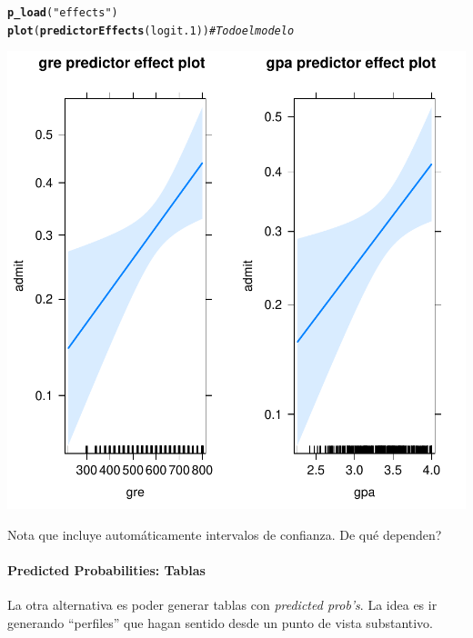 \documentclass[onesided]{article}\usepackage[]{graphicx}\usepackage[]{color}
\makeatletter
\def\maxwidth{ %
  \ifdim\Gin@nat@width>\linewidth
    \linewidth
  \else
    \Gin@nat@width
  \fi
}
\newcommand{\hlstr}[1]{\textcolor[rgb]{0.192,0.494,0.8}{#1}}%
\newcommand{\hlcom}[1]{\textcolor[rgb]{0.678,0.584,0.686}{\textit{#1}}}%
\newcommand{\hlstd}[1]{\textcolor[rgb]{0.345,0.345,0.345}{#1}}%
\newcommand{\hlkwd}[1]{\textcolor[rgb]{0.737,0.353,0.396}{\textbf{#1}}}%
\newenvironment{kframe}{%
 \def\at@end@of@kframe{}%
 \ifinner\ifhmode%
  \def\at@end@of@kframe{\end{minipage}}%
  \begin{minipage}{\columnwidth}%
 \fi\fi%
 \def\FrameCommand##1{\hskip\@totalleftmargin \hskip-\fboxsep
 \colorbox{shadecolor}{##1}\hskip-\fboxsep
     \hskip-\linewidth \hskip-\@totalleftmargin \hskip\columnwidth}%
 \MakeFramed {\advance\hsize-\width
   \@totalleftmargin\z@ \linewidth\hsize
   \@setminipage}}%
 {\par\unskip\endMakeFramed%
 \at@end@of@kframe}
\newenvironment{knitrout}{}{} %
\makeatother
\begin{document}
\begin{knitrout}
\color{fgcolor}\begin{kframe}
\begin{alltt}
\hlkwd{p_load}\hlstd{(}\hlstr{"effects"}\hlstd{)}
\hlkwd{plot}\hlstd{(}\hlkwd{predictorEffects}\hlstd{(logit.1))} \hlcom{# Todo el modelo }
\end{alltt}
\end{kframe}

{\centering \includegraphics[width=\maxwidth]{figure/predict:2-1} 

}



\end{knitrout}

Nota que incluye autom\'aticamente intervalos de confianza. De qu\'e dependen?

\paragraph{Predicted Probabilities: Tablas}

La otra alternativa es poder generar tablas con \emph{predicted prob's}. La idea es ir generando ``perfiles'' que hagan sentido desde un punto de vista substantivo. 
\end{document}
